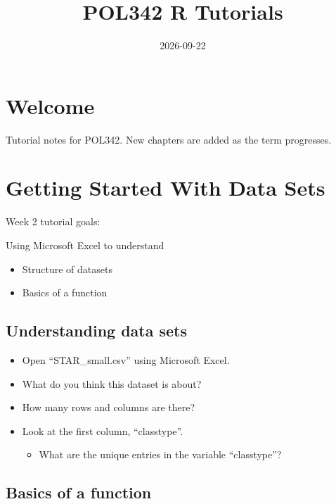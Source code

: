 \documentclass[
]{book}
\title{POL342 R Tutorials}
\author{}
\date{\vspace{-2.5em}2026-09-22}
\providecommand{\tightlist}{%
  \setlength{\itemsep}{0pt}\setlength{\parskip}{0pt}}
\begin{document}
\maketitle

{
\setcounter{tocdepth}{1}
\tableofcontents
}
\chapter*{Welcome}\label{welcome}

Tutorial notes for POL342. New chapters are added as the term progresses.

\chapter{Getting Started With Data Sets}\label{getting-started-with-data-sets}

Week 2 tutorial goals:

Using Microsoft Excel to understand

\begin{itemize}
\tightlist
\item
  Structure of datasets
\item
  Basics of a function
\end{itemize}

\section{Understanding data sets}\label{understanding-data-sets}

\begin{itemize}
\item
  Open ``STAR\_small.csv'' using Microsoft Excel.
\item
  What do you think this dataset is about?
\item
  How many rows and columns are there?
\item
  Look at the first column, ``classtype''.

  \begin{itemize}
  \tightlist
  \item
    What are the unique entries in the variable ``classtype''?
  \end{itemize}
\end{itemize}

\section{Basics of a function}\label{basics-of-a-function}
\end{document}
